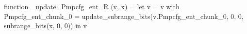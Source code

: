 function _update_Pmpcfg_ent_R (v, x) = let v = { v with Pmpcfg_ent_chunk_0 = update_subrange_bits(v.Pmpcfg_ent_chunk_0, 0, 0, subrange_bits(x, 0, 0)) } in
  v
